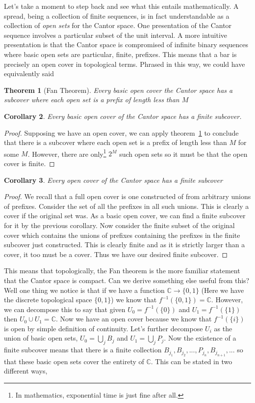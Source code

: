 \documentclass[12pt]{amsart}
\newcommand{\cantor}{\mathbb{C}} %
\newtheorem{thm}{Theorem}[section]
\newtheorem{cor}[thm]{Corollary}
\begin{document}
Let's take a moment to step back and see what this entails
mathematically. A spread, being a collection of finite sequences, is
in fact understandable as a collection of \emph{open sets} for the
Cantor space. One presentation of the Cantor sequence involves a
particular subset of the unit interval. A more intuitive presentation
is that the Cantor space is compromised of infinite binary sequences
where basic open sets are particular, finite, prefixes. This means
that a bar is precisely an open cover in topological terms. Phrased in
this way, we could have equivalently said
\begin{thm}[Fan Theorem]\label{thm:intro:fan2}
  Every basic open cover the Cantor space has a subcover where each open set
  is a prefix of length less than $M$
\end{thm}
\begin{cor}
  Every basic open cover of the Cantor space has a finite subcover.
\end{cor}
\begin{proof}
  Supposing we have an open cover, we can apply
  theorem~\ref{thm:intro:fan2} to conclude that there is a subcover
  where each open set is a prefix of length less than $M$ for some
  $M$. However, there are only\footnote{In mathematics, exponential
    time is just fine after all.} $2^M$ such open sets so it must be
  that the open cover is finite.
\end{proof}
\begin{cor}
  Every open cover of the Cantor space has a finite subcover
\end{cor}
\begin{proof}
  We recall that a full open cover is one constructed of from
  arbitrary unions of prefixes. Consider the set of all the prefixes
  in all such unions. This is clearly a cover if the original set
  was. As a basic open cover, we can find a finite subcover for it by
  the previous corollary. Now consider the finite subset of the
  original cover which contains the unions of prefixes containing the
  prefixes in the finite subcover just constructed. This is clearly
  finite and as it is strictly larger than a cover, it too must be
  a cover. Thus we have our desired finite subcover.
\end{proof}

This means that topologically, the Fan theorem is the more familiar
statement that the Cantor space is compact. Can we derive something
else useful from this? Well one thing we notice is that if we have a
function $\cantor \to \{0, 1\}$ (Here we have the discrete topological
space $\{0, 1\}$) we know that $f^{-1}(\{0, 1\}) = \cantor$. However,
we can decompose this to say that given $U_0 = f^{-1}(\{0\})$ and
$U_1 = f^{-1}(\{1\})$ then $U_0 \cup U_1 = \cantor$. Now we have an
open cover because we know that $f^{-1}(\{i\})$ is open by simple
definition of continuity. Let's further decompose $U_i$ as the union
of basic open sets, $U_0 = \bigcup_j B_j$ and $U_1 = \bigcup_j P_j$.
Now the existence of a finite subcover means that there is a finite
collection $B_{j_1}, B_{j_2}, ..., P_{j_n}, B_{j_{n + 1}}, ...$ so
that these basic open sets cover the entirety of $\cantor$. This can
be stated in two different ways,
\end{document}
